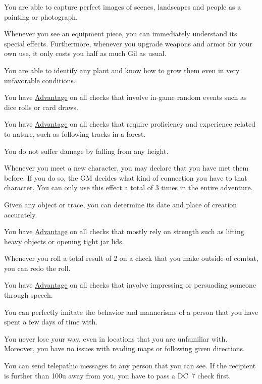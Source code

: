 \begin{description}[leftmargin=*]
{
	You are able to capture perfect images of scenes, landscapes and people as a painting or photograph.
}	

{
	Whenever you see an equipment piece, you can immediately understand its special effects.
	Furthermore, whenever you upgrade weapons and armor for your own use, it only costs you half as much Gil as usual.
}

{
	You are able to identify any plant and know how to grow them even in very unfavorable conditions.
}

{
	You have \hyperlink{check}{Advantage} on all checks that involve in-game random events such as dice rolls or card draws.
}

{
	You have \hyperlink{check}{Advantage} on all checks that require proficiency and experience related to nature, such as following tracks in a forest. 
}

{
	You do not suffer damage by falling from any height.
}

{
	Whenever you meet a new character, you may declare that you have met them before.
	If you do so, the GM decides what kind of connection you have to that character.	
	You can only use this effect a total of 3 times in the entire adventure.
}

\pagebreak

{
	Given any object or trace, you can determine its date and place of creation accurately.
}

{
	You have \hyperlink{check}{Advantage} on all checks that mostly rely on strength such as lifting heavy objects or opening tight jar lids.
}

{
	Whenever you roll a total result of 2 on a check that you make outside of combat, you can redo the roll.
}

{
	You have \hyperlink{check}{Advantage} on all checks that involve impressing or persuading someone through speech. 
}

{
	You can perfectly imitate the behavior and mannerisms of a person that you have spent a few days of time with.
}

{
	You never lose your way, even in locations that you are unfamiliar with.
	Moreover, you have no issues with reading maps or following given directions. 
}

{
	You can send telepathic messages to any person that you can see.
	If the recipient is further than 100u away from you, you have to pass a DC~7 check first.
}


\end{description}
